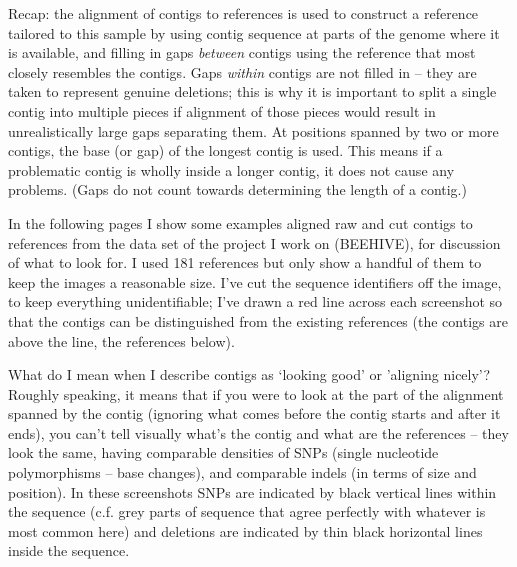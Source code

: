 \documentclass{article}
\newcommand{\shiv}{\c{shiver}\xspace}
\let\c\texttt
\begin{document}
Recap:
the alignment of contigs to references is used to construct a reference tailored to this sample by using contig sequence at parts of the genome where it is available, and filling in gaps {\it between} contigs using the reference that most closely resembles the contigs.
Gaps {\it within} contigs are not filled in -- they are taken to represent genuine deletions; this is why it is important to split a single contig into multiple pieces if alignment of those pieces would result in unrealistically large gaps separating them.
At positions spanned by two or more contigs, the base (or gap) of the longest contig is used.
This means if a problematic contig is wholly inside a longer contig, it does not cause any problems.
(Gaps do not count towards determining the length of a contig.)

In the following pages I show some examples aligned raw and cut contigs to references from the data set of the project I work on (BEEHIVE), for discussion of what to look for.
I used 181 references but only show a handful of them to keep the images a reasonable size.
I've cut the sequence identifiers off the image, to keep everything unidentifiable; I've drawn a red line across each screenshot so that the contigs can be distinguished from the existing references (the contigs are above the line, the references below).

What do I mean when I describe contigs as `looking good' or 'aligning nicely'?
Roughly speaking, it means that if you were to look at the part of the alignment spanned by the contig (ignoring what comes before the contig starts and after it ends), you can't tell visually what's the contig and what are the references -- they look the same, having comparable densities of SNPs (single nucleotide polymorphisms -- base changes), and comparable indels (in terms of size and position).
In these screenshots SNPs are indicated by black vertical lines within the sequence (c.f. grey parts of sequence that agree perfectly with whatever is most common here) and deletions are indicated by thin black horizontal lines inside the sequence.
\end{document}
